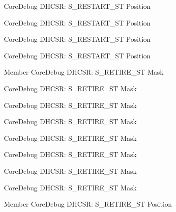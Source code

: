 \begin{DoxyRefList}
\label{deprecated__deprecated000107}%
%
Core\+Debug DHCSR\+: S\+\_\+\+RESTART\+\_\+\+ST Position 

\label{deprecated__deprecated000246}%
%
Core\+Debug DHCSR\+: S\+\_\+\+RESTART\+\_\+\+ST Position 

\label{deprecated__deprecated000007}%
%
Core\+Debug DHCSR\+: S\+\_\+\+RESTART\+\_\+\+ST Position 

\label{deprecated__deprecated000161}%
%
Core\+Debug DHCSR\+: S\+\_\+\+RESTART\+\_\+\+ST Position  
\item[Member \doxylink{group__CMSIS__CoreDebug_ga89dceb5325f6bcb36a0473d65fbfcfa6}{Core\+Debug\+\_\+\+DHCSR\+\_\+\+S\+\_\+\+RETIRE\+\_\+\+ST\+\_\+\+Msk} ]\label{deprecated__deprecated000565}%
%
Core\+Debug DHCSR\+: S\+\_\+\+RETIRE\+\_\+\+ST Mask 

\label{deprecated__deprecated000251}%
%
Core\+Debug DHCSR\+: S\+\_\+\+RETIRE\+\_\+\+ST Mask 

\label{deprecated__deprecated000384}%
%
Core\+Debug DHCSR\+: S\+\_\+\+RETIRE\+\_\+\+ST Mask 

\label{deprecated__deprecated000012}%
%
Core\+Debug DHCSR\+: S\+\_\+\+RETIRE\+\_\+\+ST Mask 

\label{deprecated__deprecated000166}%
%
Core\+Debug DHCSR\+: S\+\_\+\+RETIRE\+\_\+\+ST Mask 

\label{deprecated__deprecated000112}%
%
Core\+Debug DHCSR\+: S\+\_\+\+RETIRE\+\_\+\+ST Mask 

\label{deprecated__deprecated000463}%
%
Core\+Debug DHCSR\+: S\+\_\+\+RETIRE\+\_\+\+ST Mask 

\label{deprecated__deprecated000308}%
%
Core\+Debug DHCSR\+: S\+\_\+\+RETIRE\+\_\+\+ST Mask  
\item[Member \doxylink{group__CMSIS__CoreDebug_ga2328118f8b3574c871a53605eb17e730}{Core\+Debug\+\_\+\+DHCSR\+\_\+\+S\+\_\+\+RETIRE\+\_\+\+ST\+\_\+\+Pos} ]\label{deprecated__deprecated000250}%
%
Core\+Debug DHCSR\+: S\+\_\+\+RETIRE\+\_\+\+ST Position 


\end{DoxyRefList}
